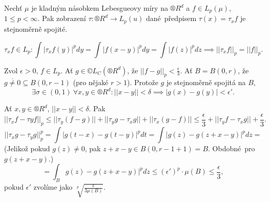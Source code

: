 \documentclass[12pt]{article}					%
\begin{document}
\begin{veta}
	Nechť $\mu$ je kladným násobkem Lebesgueovy míry na $®R^d$ a $f \in L_p(\mu)$, $1 ≤ p < ∞$. Pak zobrazení $\tau: ®R^d \rightarrow L_p(u)$ dané předpisem $\tau(x) = \tau_x f$ je stejnoměrně spojité.

	\begin{dukazin}
		$$ \tau_x f \in L_p: \int |\tau_x f(y)|^p dy = \int |f(x - y)|^p dy = \int |f(z)|^p dz \implies ||\tau_x f||_p = ||f||_p. $$

		Zvol $\epsilon > 0$, $f \in L_p$. Ať $g \in ©L_C (®R^d)$, že $||f - g||_p < \frac{\epsilon}{3}$. Ať $B = B(0, r)$, že $\overline{g ≠ 0} \subseteq B(0, r - 1)$ (pro nějaké $r > 1$). Protože $g$ je stejnoměrně spojitá na $B$,
		$$ \exists \sigma \in (0, 1)\ \forall x, y \in ®R^d: ||x - y|| < \delta \implies |g(x) - g(y)| < \epsilon'. $$

		Ať $x, y \in ®R^d$, $||x - y|| < \delta$. Pak
		$$ ||\tau_x f - \tau y f||_p ≤ ||\tau_y (f - g)|| + ||\tau_y g - \tau_x g|| + ||\tau_x(g - f)|| ≤ \frac{\epsilon}{3} + ||\tau_y f - \tau_x g|| + \frac{\epsilon}{3}. $$
		$$ ||\tau_x g - \tau_y g||_p^p = \int |g(t - x) - g(t - y)|^p dt = \int |g(z) - g(z + x - y)|^p dz = $$
		(Jelikož pokud $g(z) ≠ 0$, pak $z + x - y \in B(0, r - 1 + 1) = B$. Obdobné pro $g(z + x - y)$.)
		$$ = \int_B g(z) - g(z + x - y)|^p dz ≤ (\epsilon')^p·\mu(B) ≤ \frac{\epsilon}{3}, $$
		pokud $\epsilon'$ zvolíme jako $\sqrt[p]{\frac{\epsilon}{3\mu(B)}}$.
	\end{dukazin}
\end{veta}
\end{document}
